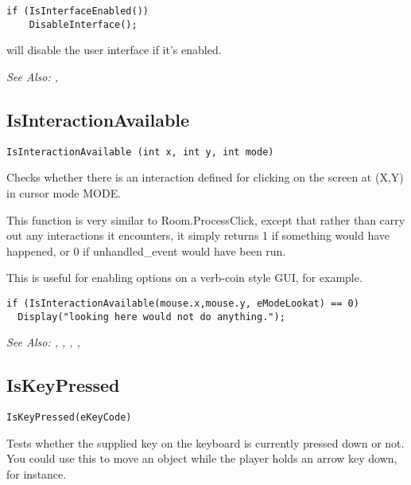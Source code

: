 \begin{verbatim}
if (IsInterfaceEnabled())
    DisableInterface();
\end{verbatim}
will disable the user interface if it's enabled.

\it{See Also:} , 


\subsection{IsInteractionAvailable}\label{IsInteractionAvailable}%

\begin{verbatim}
IsInteractionAvailable (int x, int y, int mode)
\end{verbatim}
Checks whether there is an interaction defined for clicking on the screen at (X,Y)
in cursor mode MODE.

This function is very similar to Room.ProcessClick, except that rather than carry out any
interactions it encounters, it simply returns 1 if something would have happened, or 0 if
unhandled_event would have been run.

This is useful for enabling options on a verb-coin style GUI, for example.

\begin{verbatim}
if (IsInteractionAvailable(mouse.x,mouse.y, eModeLookat) == 0)
  Display("looking here would not do anything.");
\end{verbatim}

\it{See Also:} ,
,
,
,


\subsection{IsKeyPressed}\label{IsKeyPressed}%

\begin{verbatim}
IsKeyPressed(eKeyCode)
\end{verbatim}
Tests whether the supplied key on the keyboard is currently pressed down
or not. You could use this to move an object while the player holds an
arrow key down, for instance.

